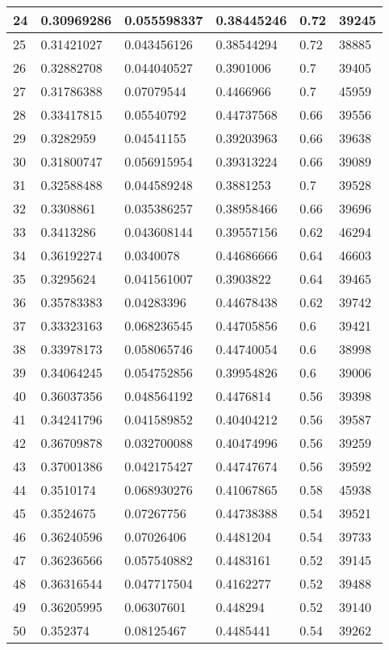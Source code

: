 \begin{longtable}{|l|l|l|l|l|l|}
24 & 0.30969286 & 0.055598337 & 0.38445246 & 0.72 & 39245 \\ \hline 
25 & 0.31421027 & 0.043456126 & 0.38544294 & 0.72 & 38885 \\ \hline 
26 & 0.32882708 & 0.044040527 & 0.3901006 & 0.7 & 39405 \\ \hline 
27 & 0.31786388 & 0.07079544 & 0.4466966 & 0.7 & 45959 \\ \hline 
28 & 0.33417815 & 0.05540792 & 0.44737568 & 0.66 & 39556 \\ \hline 
29 & 0.3282959 & 0.04541155 & 0.39203963 & 0.66 & 39638 \\ \hline 
30 & 0.31800747 & 0.056915954 & 0.39313224 & 0.66 & 39089 \\ \hline 
31 & 0.32588488 & 0.044589248 & 0.3881253 & 0.7 & 39528 \\ \hline 
32 & 0.3308861 & 0.035386257 & 0.38958466 & 0.66 & 39696 \\ \hline 
33 & 0.3413286 & 0.043608144 & 0.39557156 & 0.62 & 46294 \\ \hline 
34 & 0.36192274 & 0.0340078 & 0.44686666 & 0.64 & 46603 \\ \hline 
35 & 0.3295624 & 0.041561007 & 0.3903822 & 0.64 & 39465 \\ \hline 
36 & 0.35783383 & 0.04283396 & 0.44678438 & 0.62 & 39742 \\ \hline 
37 & 0.33323163 & 0.068236545 & 0.44705856 & 0.6 & 39421 \\ \hline 
38 & 0.33978173 & 0.058065746 & 0.44740054 & 0.6 & 38998 \\ \hline 
39 & 0.34064245 & 0.054752856 & 0.39954826 & 0.6 & 39006 \\ \hline 
40 & 0.36037356 & 0.048564192 & 0.4476814 & 0.56 & 39398 \\ \hline 
41 & 0.34241796 & 0.041589852 & 0.40404212 & 0.56 & 39587 \\ \hline 
42 & 0.36709878 & 0.032700088 & 0.40474996 & 0.56 & 39259 \\ \hline 
43 & 0.37001386 & 0.042175427 & 0.44747674 & 0.56 & 39592 \\ \hline 
44 & 0.3510174 & 0.068930276 & 0.41067865 & 0.58 & 45938 \\ \hline 
45 & 0.3524675 & 0.07267756 & 0.44738388 & 0.54 & 39521 \\ \hline 
46 & 0.36240596 & 0.07026406 & 0.4481204 & 0.54 & 39733 \\ \hline 
47 & 0.36236566 & 0.057540882 & 0.4483161 & 0.52 & 39145 \\ \hline 
48 & 0.36316544 & 0.047717504 & 0.4162277 & 0.52 & 39488 \\ \hline 
49 & 0.36205995 & 0.06307601 & 0.448294 & 0.52 & 39140 \\ \hline 
50 & 0.352374 & 0.08125467 & 0.4485441 & 0.54 & 39262 \\ \hline 
\end{longtable}